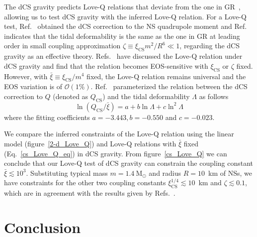 \documentclass[a4paper,11pt]{article}
\newcommand{\ZW}[1]{\textcolor{magenta}{$\mathcal{ZW}$:~#1}}
\begin{document}
The dCS gravity predicts Love-Q relations that deviate from the one in GR~\cite{Yagi:2013bca,Yagi:2013awa,Gupta:2017vsl}, 
allowing us to test dCS gravity with the inferred Love-Q relation. 
For a Love-Q test, Ref.~\cite{Yagi:2013mbt} obtained the dCS correction to the NS 
quadrupole moment and Ref.~\cite{Yagi:2011xp} indicates that the tidal 
deformability is the same as the one in GR at leading order in small coupling 
approximation $\zeta \equiv \xi_{\mathrm{CS}} m^2/R^6 \ll 1$, regarding the dCS 
gravity as an effective theory. Refs.~\cite{Yagi_2017,Yagi:2013mbt,Gupta:2017vsl} 
have discussed the Love-Q relation under dCS gravity and find that the relation 
becomes EOS-sensitive with $\xi_{\mathrm{CS}}$ or $\zeta$ fixed. However, with 
$\bar{\xi}\equiv \xi_{\mathrm{CS}}/m^4$ fixed, the Love-Q relation remains 
universal and the EOS variation is of $\mathcal{O}(1\%)$. Ref.~\cite{Gupta:2017vsl} 
parameterized the relation between the dCS correction to $Q$ (denoted as $Q_{\mathrm{CS}}$) and the tidal deformability $\Lambda$ as follows
\begin{equation}
    \label{cs_Love_Q_eq}
    \ln (Q_{\mathrm{CS}}/\bar{\xi}) = a + b \ln \Lambda + c \ln^{2} \Lambda
\end{equation} 
where the fitting coefficients $a=-3.443, b=-0.550$ and $c=-0.023$. 

We compare the inferred constraints of the Love-Q relation 
using the linear model (figure~\ref{2-d_Love_Q}) and Love-Q 
relations with $\bar{\xi}$ fixed (Eq.~\ref{cs_Love_Q_eq}) in dCS gravity. From 
figure~\ref{cs_Love_Q} we can conclude that our Love-Q test of dCS gravity can 
constrain the coupling constant $\bar{\xi} \lesssim 10^{3}$. Substituting typical 
mass $m=1.4~\mathrm{M_{\odot}}$ and radius $R=10$~km of NSs, we have constraints 
for the other two coupling constants $\xi_{\mathrm{CS}}^{1/4} \lesssim 10$~km and 
$\zeta \lesssim 0.1$, which are in agreement with the results 
given by Refs.~\cite{Yagi:2013bca,Yagi:2013awa}. 

\section{Conclusion}
\label{sec:conclusion}
\end{document}
